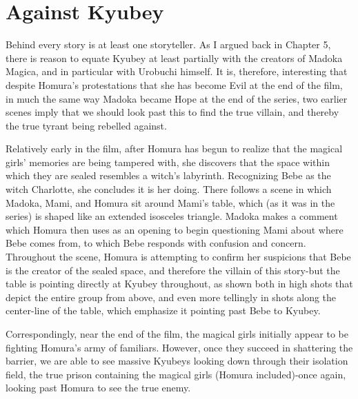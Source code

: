 \chapter{Against Kyubey}
Behind every story is at least one storyteller. As I argued back in Chapter 5, there is reason to equate Kyubey at least partially with the creators of Madoka Magica, and in particular with Urobuchi himself. It is, therefore, interesting that despite Homura's protestations that she has become Evil at the end of the film, in much the same way Madoka became Hope at the end of the series, two earlier scenes imply that we should look past this to find the true villain, and thereby the true tyrant being rebelled against.

Relatively early in the film, after Homura has begun to realize that the magical girls' memories are being tampered with, she discovers that the space within which they are sealed resembles a witch's labyrinth. Recognizing Bebe as the witch Charlotte, she concludes it is her doing. There follows a scene in which Madoka, Mami, and Homura sit around Mami's table, which (as it was in the series) is shaped like an extended isosceles triangle. Madoka makes a comment which Homura then uses as an opening to begin questioning Mami about where Bebe comes from, to which Bebe responds with confusion and concern. Throughout the scene, Homura is attempting to confirm her suspicions that Bebe is the creator of the sealed space, and therefore the villain of this story-but the table is pointing directly at Kyubey throughout, as shown both in high shots that depict the entire group from above, and even more tellingly in shots along the center-line of the table, which emphasize it pointing past Bebe to Kyubey.

Correspondingly, near the end of the film, the magical girls initially appear to be fighting Homura's army of familiars. However, once they succeed in shattering the barrier, we are able to see massive Kyubeys looking down through their isolation field, the true prison containing the magical girls (Homura included)-once again, looking past Homura to see the true enemy.

